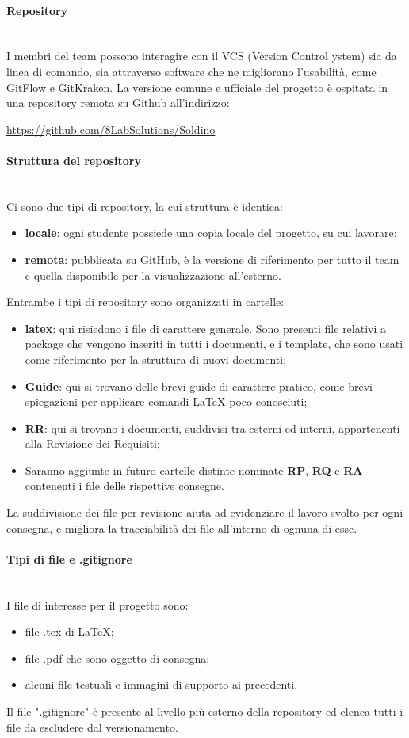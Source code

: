 	\paragraph{Repository} \mbox{}\\
	I membri del team possono interagire con il VCS (Version Control ystem) sia da linea di comando, sia attraverso software che ne migliorano l'usabilità, come GitFlow e GitKraken. La versione comune e ufficiale del progetto è ospitata in una repository remota su Github all'indirizzo:
	\centerline{\url{https://github.com/8LabSolutions/Soldino}}
	\paragraph{Struttura del repository} \mbox{}\\
	Ci sono due tipi di repository, la cui struttura è identica:
	\begin{itemize}
		\item \textbf{locale}: ogni studente possiede una copia locale del progetto, su cui lavorare;
		\item \textbf{remota}: pubblicata su GitHub, è la versione di riferimento per tutto il team e quella disponibile per la visualizzazione all'esterno.
	\end{itemize}						
	Entrambe i tipi di repository sono organizzati in cartelle:
	\begin{itemize}
		\item \textbf{latex}: qui risiedono i file di carattere generale. Sono presenti file relativi a package che vengono inseriti in tutti i documenti, e i template, che sono usati come riferimento per la struttura di nuovi documenti;
		\item \textbf{Guide}: qui si trovano delle brevi guide di carattere pratico, come brevi spiegazioni per applicare comandi \LaTeX{} poco conosciuti;
		\item \textbf{RR}: qui si trovano i documenti, suddivisi tra esterni ed interni, appartenenti alla Revisione dei Requisiti;
		\item Saranno aggiunte in futuro cartelle distinte nominate \textbf{RP}, \textbf{RQ} e \textbf{RA} contenenti i file delle rispettive consegne.
	\end{itemize}
	La suddivisione dei file per revisione aiuta ad evidenziare il lavoro svolto per ogni consegna, e migliora la tracciabilità dei file all'interno di ognuna di esse.
	\paragraph{Tipi di file e .gitignore} \mbox{}\\
	I file di interesse per il progetto sono:
	\begin{itemize}
		\item file .tex di \LaTeX{};
		\item file .pdf che sono oggetto di consegna;
		\item alcuni file testuali e immagini di supporto ai precedenti.
	\end{itemize}			
	Il file ".gitignore" è presente al livello più esterno della repository ed elenca tutti i file da escludere dal versionamento. 
